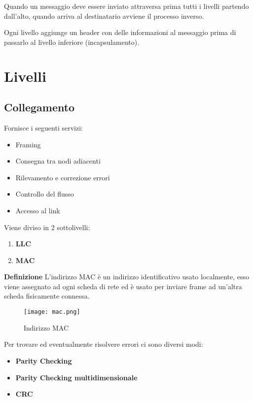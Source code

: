 \documentclass{article}
\begin{document}
\noindent Quando un messaggio deve essere inviato attraversa prima tutti i livelli partendo dall'alto, quando arriva al destinatario avviene il processo inverso.\newline

\noindent Ogni livello aggiunge un header con delle informazioni al messaggio prima di passarlo al livello inferiore (incapsulamento).\newline

\section{Livelli}

\subsection{Collegamento}

Fornisce i seguenti servizi:
\begin{itemize}
    \item Framing 
    \item Consegna tra nodi adiacenti
    \item Rilevamento e correzione errori
    \item Controllo del flusso
    \item Accesso al link\newline
\end{itemize}

\noindent Viene diviso in 2 sottolivelli:
\begin{enumerate}
    \item \textbf{LLC}
    \item \textbf{MAC}\newline
\end{enumerate}

\noindent\textbf{Definizione} L'indirizzo MAC è un indirizzo identificativo usato localmente, esso viene assegnato ad ogni scheda di rete ed è usato per inviare frame ad un'altra scheda fisicamente connessa.\newline

\begin{figure}[ht]
    \centering
    \texttt{[image: mac.png]}
    \caption{Indirizzo MAC}
    \label{fig:mac}
\end{figure}

\noindent Per trovare ed eventualmente risolvere errori ci sono diversi modi:
\begin{itemize}
    \item \textbf{Parity Checking}

    \item \textbf{Parity Checking multidimensionale}

    \item \textbf{CRC}\newline

\end{itemize}
\end{document}
